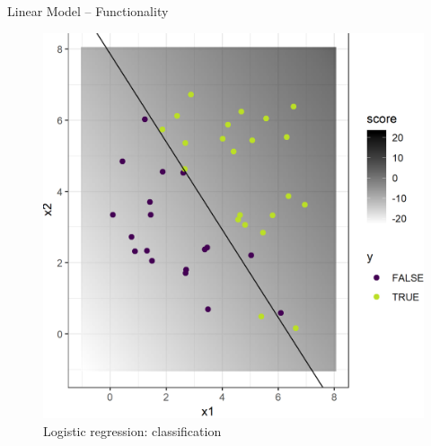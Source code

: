 \documentclass[11pt,compress,t,notes=noshow, xcolor=table]{beamer}
\begin{document}
\begin{frame}{Linear Model -- Functionality}
\begin{minipage}{0.32\textwidth}
\begin{center}
\begin{figure}[h!]
        \end{figure}
      \end{center}
    \end{minipage}
  \begin{minipage}{0.32\textwidth}
    \begin{center}
      \begin{figure}[h!]
        \caption{Logistic regression: classification}
        \includegraphics[height=0.6\textwidth, keepaspectratio=true]{figure/logreg-2vars-data.png}
      \end{figure}
    \end{center}
  \end{minipage}
\end{frame}

\end{document}
